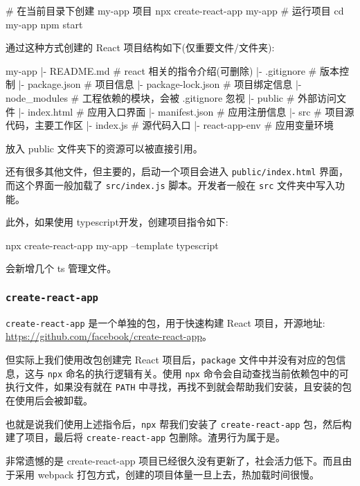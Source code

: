 \begin{bash}
# 在当前目录下创建 my-app 项目
npx create-react-app my-app
# 运行项目
cd my-app
npm start
\end{bash}

通过这种方式创建的 React 项目结构如下(仅重要文件/文件夹):

\begin{bash}
my-app
|- README.md            # react 相关的指令介绍(可删除)
|- .gitignore           # 版本控制
|- package.json         # 项目信息
|- package-lock.json    # 项目绑定信息
|- node_modules         # 工程依赖的模块，会被 .gitignore 忽视
|- public               # 外部访问文件
    |- index.html       # 应用入口界面
    |- manifest.json    # 应用注册信息
|- src              # 项目源代码，主要工作区
    |- index.js     # 源代码入口
    |- react-app-env    # 应用变量环境
\end{bash}

放入 public 文件夹下的资源可以被直接引用。

还有很多其他文件，但主要的，启动一个项目会进入 \texttt{public/index.html} 界面，而这个界面一般加载了 \texttt{src/index.js} 脚本。开发者一般在 \texttt{src} 文件夹中写入功能。

此外，如果使用 typescript开发，创建项目指令如下:

\begin{bash}
npx create-react-app my-app --template typescript
\end{bash}

会新增几个 ts 管理文件。

\subsubsection*{\texttt{create-react-app}}

\texttt{create-react-app} 是一个单独的包，用于快速构建 React 项目，开源地址: \url{https://github.com/facebook/create-react-app}。

但实际上我们使用改包创建完 React 项目后，\texttt{package} 文件中并没有对应的包信息，这与 \texttt{npx} 命名的执行逻辑有关。使用 \texttt{npx} 命令会自动查找当前依赖包中的可执行文件，如果没有就在 \texttt{PATH} 中寻找，再找不到就会帮助我们安装，且安装的包在使用后会被卸载。

也就是说我们使用上述指令后，\texttt{npx} 帮我们安装了 \texttt{create-react-app} 包，然后构建了项目，最后将 \texttt{create-react-app} 包删除。渣男行为属于是。

非常遗憾的是 create-react-app 项目已经很久没有更新了，社会活力低下。而且由于采用 webpack 打包方式，创建的项目体量一旦上去，热加载时间很慢。


